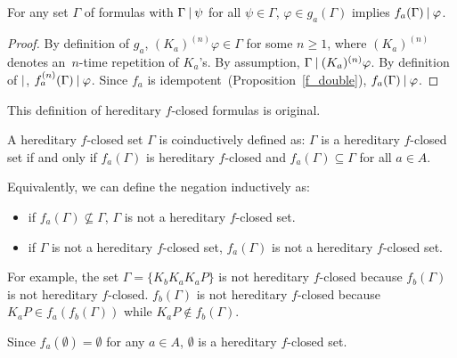 \begin{lemma}
 \label{ugougo}
 For any set $\Gamma$ of formulas with $\Gamma\mathbin{\mid}\psi$ for all $\psi\in\Gamma$,
 $\varphi\in g_a(\Gamma)$ implies $f_a(\Gamma)\mathbin{\mid}\varphi$.
\end{lemma}
\begin{proof}
 By definition of $g_a$, $(K_a)^{(n)}\varphi\in \Gamma$ for some $n\ge 1$, where
 $(K_a)^{(n)}$ denotes an~$n$-time repetition of $K_a$'s.
 By assumption, $\Gamma\mathbin{\mid} (K_a)^{(n)}\varphi$.
 By definition of $\mathbin{\mid}$, $f_a^{(n)}(\Gamma)\mathbin{\mid}\varphi$.
 Since $f_a$ is idempotent~(Proposition~\ref{f_double}), $f_a(\Gamma)\mathbin{\mid} \varphi$.
\end{proof}

This definition of hereditary $f$-closed formulas is original.
\begin{definition}
 A hereditary $f$-closed set $\Gamma$ is coinductively defined as:
 $\Gamma$ is a hereditary $f$-closed set if and only
 if $f_a(\Gamma)$ is hereditary $f$-closed and $f_a(\Gamma)\subseteq \Gamma$ for all $a\in
 A$.
\end{definition}
Equivalently, we can define the negation inductively as:
\begin{itemize}
 \item if $f_a(\Gamma) \not\subseteq \Gamma$, $\Gamma$ is not a hereditary $f$-closed set.
 \item if $\Gamma$ is not a hereditary $f$-closed set, $f_a(\Gamma)$ is not a hereditary
       $f$-closed set.
\end{itemize}
For example, the set $\Gamma = \{K_b K_a K_a P\}$ is not hereditary $f$-closed
because $f_b(\Gamma)$ is not hereditary $f$-closed.
$f_b(\Gamma)$ is not hereditary $f$-closed
 because $K_a P \in f_a(f_b(\Gamma))$ while $K_a P\notin f_b(\Gamma)$.

 Since $f_a(\emptyset) = \emptyset$  for any $a\in A$,
 $\emptyset$ is a hereditary $f$-closed set.


